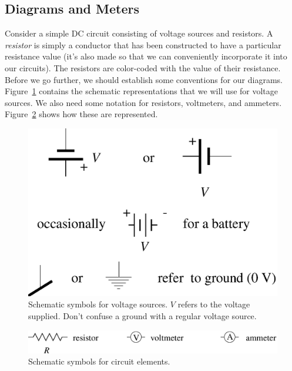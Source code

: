 \subsection{Diagrams and Meters}
Consider a simple DC circuit consisting of voltage sources and resistors.  A 
{\it resistor} is simply a conductor that has been constructed to have a 
particular resistance value (it's also made so that we can conveniently 
incorporate it into our circuits). The resistors are color-coded with the value
of their resistance. 
Before we go further, we should establish some conventions for our diagrams. 
Figure~\ref{fig:DC:voltsource} contains the schematic representations that we 
will use for voltage sources.  We also need some notation for resistors, 
voltmeters, and ammeters. 
Figure~\ref{fig:DC:schemdef} shows how these are represented.
\suppressfloats
\begin{figure}[!htb]
\centering \epsfxsize=8cm \includegraphics[scale=0.5]{2_dc/voltsource.eps}
\caption{Schematic symbols for voltage sources. $V$ refers to the voltage 
\hspace*{1cm} supplied. Don't confuse a ground with a regular voltage source.}
\label{fig:DC:voltsource}
\end{figure}

\begin{figure}[!htb]
\centering \epsfxsize=13cm \includegraphics[scale=0.5]{2_dc/schemdef.eps}
\caption{Schematic symbols for circuit elements.}
\label{fig:DC:schemdef}
\end{figure}

